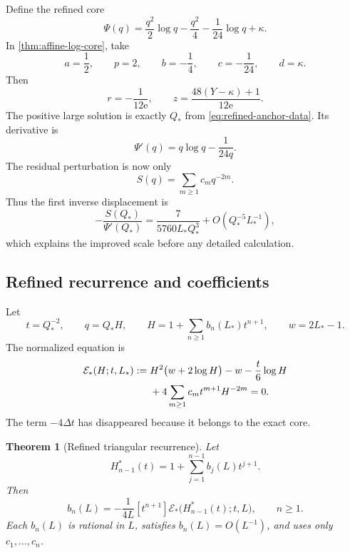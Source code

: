 \documentclass[11pt,oneside]{article}
\theoremstyle{plain}
\newtheorem{theorem}{Theorem}[section]
\theoremstyle{definition}
\theoremstyle{remark}
\newcommand{\e}{\mathrm{e}}
\newcommand{\coeff}[2]{\left[#1^{#2}\right]}
\newcommand{\calE}{\mathcal{E}}
\begin{document}
Define the refined core
\begin{equation}
 \Psi(q)=\frac{q^2}{2}\log q-\frac{q^2}{4}
 -\frac1{24}\log q+\kappa.
 \label{eq:Psi-K}
\end{equation}
In \cref{thm:affine-log-core}, take
\[
 a=\frac12,
 \qquad p=2,
 \qquad b=-\frac14,
 \qquad c=-\frac1{24},
 \qquad d=\kappa.
\]
Then
\begin{equation}
 r=-\frac1{12\e},
 \qquad
 z=\frac{48(Y-\kappa)+1}{12\e}.
 \label{eq:K-r-z}
\end{equation}
The positive large solution is exactly \(Q_*\) from
\eqref{eq:refined-anchor-data}.  Its derivative is
\begin{equation}
 \Psi'(q)=q\log q-\frac1{24q}.
 \label{eq:Psi-prime}
\end{equation}
The residual perturbation is now only
\begin{equation}
 S(q)=\sum_{m\ge1}c_mq^{-2m}.
 \label{eq:S-tail}
\end{equation}
Thus the first inverse displacement is
\[
 -\frac{S(Q_*)}{\Psi'(Q_*)}
 =\frac{7}{5760L_*Q_*^3}+O(Q_*^{-5}L_*^{-1}),
\]
which explains the improved scale before any detailed calculation.

\subsection{Refined recurrence and coefficients}

Let
\begin{equation}
 t=Q_*^{-2},\qquad q=Q_*H,
 \qquad
 H=1+\sum_{n\ge1}b_n(L_*)t^{n+1},
 \qquad w=2L_*-1.
 \label{eq:Hstar-def}
\end{equation}
The normalized equation is
\begin{align}
 \calE_*(H;t,L_*):={}&H^2\bigl(w+2\log H\bigr)-w
 -\frac{t}{6}\log H
 \notag\\
 &+4\sum_{m\ge1}c_m t^{m+1}H^{-2m}=0.
 \label{eq:E-refined}
\end{align}
The term \(-4\Delta t\) has disappeared because it belongs to the exact core.

\begin{theorem}[Refined triangular recurrence]
\label{thm:refined-recurrence}
Let
\begin{equation}
 H_{n-1}^*(t)=1+\sum_{j=1}^{n-1}b_j(L)t^{j+1}.
 \label{eq:Hstar-partial}
\end{equation}
Then
\begin{equation}
 \boxed{
 b_n(L)=-\frac1{4L}\coeff{t}{n+1}
 \calE_*\bigl(H_{n-1}^*(t);t,L\bigr),\qquad n\ge1.}
 \label{eq:bn-recurrence}
\end{equation}
Each \(b_n(L)\) is rational in \(L\), satisfies \(b_n(L)=O(L^{-1})\), and
uses only \(c_1,\ldots,c_n\).
\end{theorem}
\end{document}
